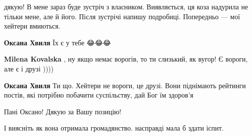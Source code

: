 \begin{itemize}
\begin{itemize}
 
дякую! В мене зараз буде зустріч з власником. Виявляється, ця коза надурила не тільки мене, але й його. Після зустрічі напишу подробиці. Попередньо — мої хейтери вмиються.

 
\textbf{Оксана Хвиля} Їх є у тебе 😂😂😂

 
\textbf{Milena Kovalska} , ну якщо немає ворогів, то ти слизький, як вугор! Є вороги, але є і друзі ))))

 
\textbf{Оксана Хвиля} Ти що. Хейтери не вороги, це друзі. Вони піднімають рейтинги постів, які потрібно побачити суспільству, дай Бог їм здоров'я 🤣🤣🤣
\end{itemize}

 
Пані Оксано! Дякую за Вашу позицію! 💙💛

 
І виясніть як вона отримала громадянство. насправді мала б здати іспит.


\end{itemize}
